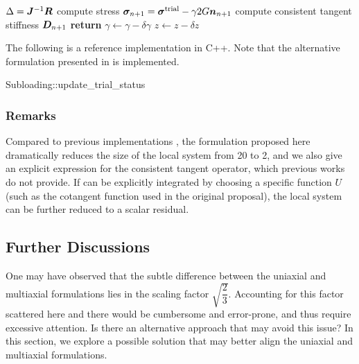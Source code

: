 \begin{breakablealgorithm}
\begin{algorithmic}[1]
        \State $\Delta=\bm{J}^{-1}\bm{R}$
        \State compute stress $\bm{\sigma}_{n+1}=\bm{\sigma}^\text{trial}-\gamma2G\bm{n}_{n+1}$
        \State compute consistent tangent stiffness $\bm{D}_{n+1}$
        \State \textbf{return}
        \EndIf
        \State $\gamma\leftarrow\gamma-\delta\gamma$
        \State $z\leftarrow{}z-\delta{}z$
        \EndWhile
    \end{algorithmic}
\end{breakablealgorithm}

The following is a reference implementation in C++.
Note that the alternative formulation presented in  is implemented.
\begin{cppcode}
Subloading::update_trial_status
\end{cppcode}
\subsubsection{Remarks}
Compared to previous implementations \cite{Fincato2017,Anjiki2019}, the formulation proposed here dramatically reduces the size of the local system from \num{20} to \num{2}, and we also give an explicit expression for the consistent tangent operator, which previous works do not provide.
If  can be explicitly integrated by choosing a specific function $U$ (such as the cotangent function used in the original proposal), the local system can be further reduced to a scalar residual.
\subsection{Further Discussions}
One may have observed that the subtle difference between the uniaxial and multiaxial formulations lies in the scaling factor $\sqrt{\dfrac{2}{3}}$.
Accounting for this factor scattered here and there would be cumbersome and error-prone, and thus require excessive attention.
Is there an alternative approach that may avoid this issue?
In this section, we explore a possible solution that may better align the uniaxial and multiaxial formulations.

